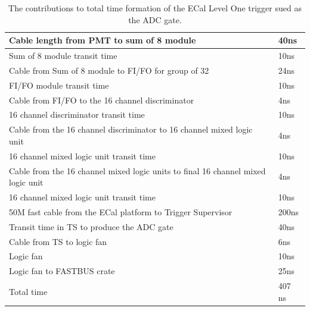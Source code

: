 \documentclass{article}
\begin{document}
 \begin{table}
 	\begin{tabular}{|l|l|} \hline
 		Cable length from PMT to sum of 8 module & 40ns \\ \hline
 		Sum of 8 module transit time & 10ns \\ \hline
 		Cable from Sum of 8 module to FI/FO for group of 32 & 24ns \\ \hline
 		FI/FO module transit time & 10ns \\ \hline
 		Cable from FI/FO to the 16 channel discriminator & 4ns \\ \hline
 		 16 channel discriminator  transit time & 10ns \\ \hline
 		 Cable from the 16 channel discriminator to 16 channel mixed logic unit& 4ns \\ \hline
  		 16 channel mixed logic unit  transit time & 10ns \\ \hline
  		 Cable from the 16 channel mixed logic units to final 16 channel mixed logic unit& 4ns \\ \hline
  		 16 channel mixed logic unit  transit time & 10ns \\ \hline
  		 50M fast cable from the ECal platform to Trigger Supervisor & 200ns \\ \hline
  		 Transit time in TS to produce the ADC gate & 40ns \\ \hline
  		 Cable from TS to logic fan  & 6ns \\ \hline\hline
                 Logic fan  & 10ns \\ \hline\hline
                 Logic fan to FASTBUS crate & 25ns \\ \hline\hline
  		 Total time & 407 ns \\ \hline  		   		  		 		 
 	\end{tabular}
 	\caption{The contributions to total time formation of the ECal Level One trigger sued as the ADC gate.}
 	\label{tab:ECALTrigtime}
 \end{table}
 
\end{document}
